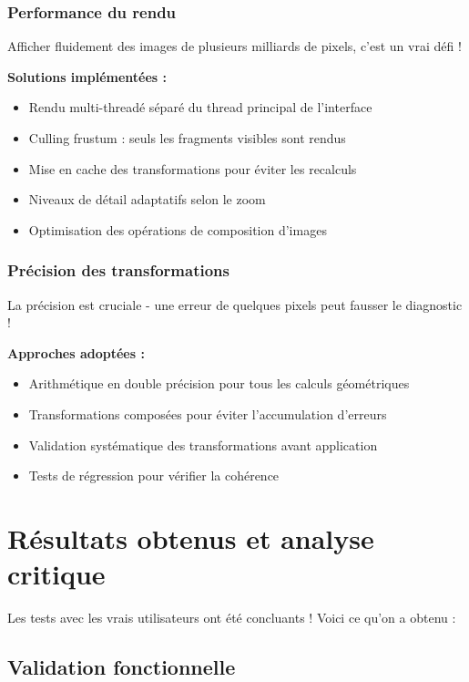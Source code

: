 \documentclass[11pt,a4paper]{report}
\begin{document}
\subsubsection{Performance du rendu}

Afficher fluidement des images de plusieurs milliards de pixels, c'est un vrai défi !

\textbf{Solutions implémentées :}
\begin{itemize}
\item Rendu multi-threadé séparé du thread principal de l'interface
\item Culling frustum : seuls les fragments visibles sont rendus
\item Mise en cache des transformations pour éviter les recalculs
\item Niveaux de détail adaptatifs selon le zoom
\item Optimisation des opérations de composition d'images
\end{itemize}

\subsubsection{Précision des transformations}

La précision est cruciale - une erreur de quelques pixels peut fausser le diagnostic !

\textbf{Approches adoptées :}
\begin{itemize}
\item Arithmétique en double précision pour tous les calculs géométriques
\item Transformations composées pour éviter l'accumulation d'erreurs
\item Validation systématique des transformations avant application
\item Tests de régression pour vérifier la cohérence
\end{itemize}

\section{Résultats obtenus et analyse critique}

Les tests avec les vrais utilisateurs ont été concluants ! Voici ce qu'on a obtenu :

\subsection{Validation fonctionnelle}
\end{document}
